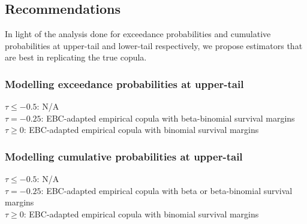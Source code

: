 \documentclass[12pt]{report}
\newcommand{\1}{\mathbf{1}}
\begin{document}
\begin{flushleft}
\newpage
\subsection{Recommendations}

In light of the analysis done for exceedance probabilities and cumulative probabilities at upper-tail and lower-tail respectively, we propose estimators that are best in replicating the true copula.

\subsubsection{Modelling exceedance probabilities at upper-tail}
$\tau \le -0.5$: N/A\\
$\tau = -0.25$: EBC-adapted empirical copula with beta-binomial survival margins \\
$\tau \ge 0$: EBC-adapted empirical copula with binomial survival margins

\subsubsection{Modelling cumulative probabilities at upper-tail}
$\tau \le -0.5$: N/A\\
$\tau = -0.25$: EBC-adapted empirical copula with beta or beta-binomial survival margins \\
$\tau \ge 0$: EBC-adapted empirical copula with binomial survival margins

\newpage

\end{flushleft}
\end{document}
